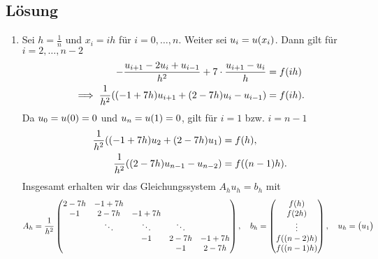 \documentclass{exercise}
\begin{document}
    \subsection*{Lösung}
    \begin{enumerate}
        \item Sei \(h = \frac{1}{n}\) und \(x_i = ih\) für \(i = 0, \ldots, n\).
        Weiter sei \(u_i = u\parentheses*{x_i}\).
        Dann gilt für \(i = 2, \ldots, n - 2\)
        \begin{align*}
            -\frac{u_{i + 1} - 2u_i + u_{i - 1}}{h^2} + 7 \cdot \frac{u_{i + 1} - u_i}{h} &= f\parentheses*{ih}\\
            \implies \frac{1}{h^2}\parentheses*{\parentheses*{-1 + 7h}u_{i + 1} + \parentheses*{2 - 7h}u_i - u_{i - 1}} &= f\parentheses*{ih}.
        \end{align*}
        Da \(u_0 = u\parentheses*{0} = 0\) und \(u_n = u\parentheses*{1} = 0\), gilt für \(i = 1\) bzw. \(i = n - 1\)
        \begin{align*}
            \frac{1}{h^2}\parentheses*{\parentheses*{-1 + 7h}u_2 + \parentheses*{2 - 7h}u_1} &= f\parentheses*{h},\\
            \frac{1}{h^2}\parentheses*{\parentheses*{2 - 7h}u_{n - 1} - u_{n - 2}} &= f\parentheses*{\parentheses*{n - 1}h}.
        \end{align*}
        Insgesamt erhalten wir das Gleichungssystem \(A_h u_h = b_h\) mit
        \[
            A_h = \frac{1}{h^2}\begin{pmatrix}
                2 - 7h & -1 + 7h\\
                -1 & 2 - 7h & -1 + 7h\\
                & \ddots & \ddots & \ddots\\
                & & -1 & 2 - 7h & -1 + 7h\\
                & & & -1 & 2 - 7h
            \end{pmatrix}, \quad b_h = \begin{pmatrix}
                f\parentheses*{h}\\
                f\parentheses*{2h}\\
                \vdots\\
                f\parentheses*{\parentheses*{n - 2}h}\\
                f\parentheses*{\parentheses*{n - 1}h}
            \end{pmatrix}, \quad u_h = \begin{pmatrix}
                u_1\\

\end{pmatrix}\]
\end{enumerate}
\end{document}
